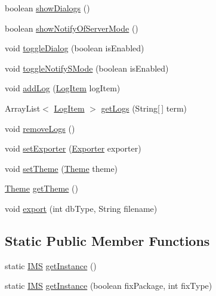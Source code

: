 \begin{DoxyCompactItemize}
\item 
boolean \hyperlink{classw3se_1_1_model_1_1_i_m_s_a18779685847f2ff22c1678e0a98ace7c}{show\-Dialogs} ()
\item 
boolean \hyperlink{classw3se_1_1_model_1_1_i_m_s_af2aa994fcba81febb572661fd94a858c}{show\-Notify\-Of\-Server\-Mode} ()
\item 
void \hyperlink{classw3se_1_1_model_1_1_i_m_s_ae99e4420980701b35e43c699e27010e2}{toggle\-Dialog} (boolean is\-Enabled)
\item 
void \hyperlink{classw3se_1_1_model_1_1_i_m_s_ab8d1d4e542f5c9087f7a942f946d18ca}{toggle\-Notify\-S\-Mode} (boolean is\-Enabled)
\item 
void \hyperlink{classw3se_1_1_model_1_1_i_m_s_a1aa3c3d72b75820ea513dc9ecd84c85c}{add\-Log} (\hyperlink{classw3se_1_1_model_1_1_base_1_1_log_item}{Log\-Item} log\-Item)
\item 
Array\-List$<$ \hyperlink{classw3se_1_1_model_1_1_base_1_1_log_item}{Log\-Item} $>$ \hyperlink{classw3se_1_1_model_1_1_i_m_s_ade685269d8a34487454bf6f3fe28f1c9}{get\-Logs} (String\mbox{[}$\,$\mbox{]} term)
\item 
void \hyperlink{classw3se_1_1_model_1_1_i_m_s_ac1bd2e9c0134253713903e505be2f3e5}{remove\-Logs} ()
\item 
void \hyperlink{classw3se_1_1_model_1_1_i_m_s_a40287fba5b697b2cfffde138abf3ede3}{set\-Exporter} (\hyperlink{interfacew3se_1_1_model_1_1_exporter}{Exporter} exporter)
\item 
void \hyperlink{classw3se_1_1_model_1_1_i_m_s_abb689438ee165fe2fda69101844920fc}{set\-Theme} (\hyperlink{classw3se_1_1_model_1_1_base_1_1_theme}{Theme} theme)
\item 
\hyperlink{classw3se_1_1_model_1_1_base_1_1_theme}{Theme} \hyperlink{classw3se_1_1_model_1_1_i_m_s_a99b947260cbfe76128d1e5d051196f98}{get\-Theme} ()
\item 
void \hyperlink{classw3se_1_1_model_1_1_i_m_s_ac01b784276d9a0b50fef58ecfa96a8d0}{export} (int db\-Type, String filename)
\end{DoxyCompactItemize}
\subsection*{Static Public Member Functions}
\begin{DoxyCompactItemize}
\item 
static \hyperlink{classw3se_1_1_model_1_1_i_m_s}{I\-M\-S} \hyperlink{classw3se_1_1_model_1_1_i_m_s_a5299c158ec89a60311972fe4b641ecd7}{get\-Instance} ()
\item 
static \hyperlink{classw3se_1_1_model_1_1_i_m_s}{I\-M\-S} \hyperlink{classw3se_1_1_model_1_1_i_m_s_aa77dde760ec38fcbb55ce806f74df852}{get\-Instance} (boolean fix\-Package, int fix\-Type)
\end{DoxyCompactItemize}
